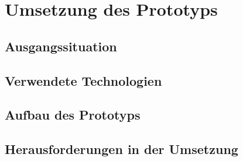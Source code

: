 \chapter{Umsetzung des Prototyps}


\section{Ausgangssituation}


\section{Verwendete Technologien}



\section{Aufbau des Prototyps}

\section{Herausforderungen in der Umsetzung}